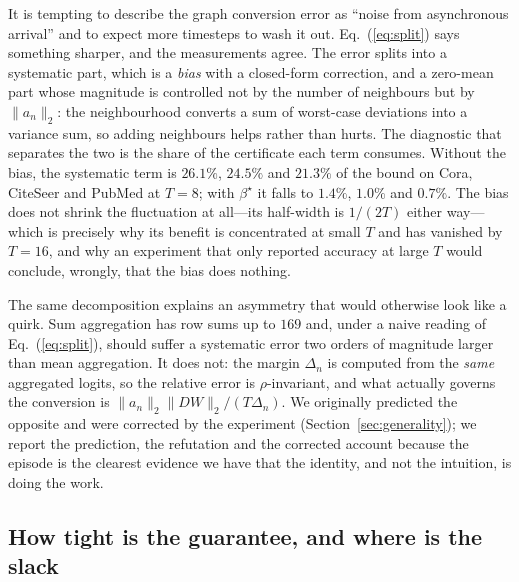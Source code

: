 \documentclass[10pt,twocolumn]{article}
\newcommand{\betastar}{\beta^{\star}}
\newcommand{\anorm}{\lVert a_{n}\rVert_{2}}
\newcommand{\Deltan}{\Delta_{n}}
\newcommand{\secref}[1]{Section~\ref{#1}}
\newcommand{\eqnref}[1]{Eq.~(\ref{#1})}
\begin{document}
It is tempting to describe the graph conversion error as ``noise from asynchronous arrival'' and to
expect more timesteps to wash it out. \eqnref{eq:split} says something sharper, and the measurements
agree. The error splits into a systematic part, which is a \emph{bias} with a closed-form correction,
and a zero-mean part whose magnitude is controlled not by the number of neighbours but by $\anorm$:
the neighbourhood converts a sum of worst-case deviations into a variance sum, so adding neighbours
helps rather than hurts. The diagnostic that separates the two is the share of the certificate each
term consumes. Without the bias, the systematic term is $26.1\%$, $24.5\%$ and $21.3\%$ of the bound
on Cora, CiteSeer and PubMed at $T=8$; with $\betastar$ it falls to $1.4\%$, $1.0\%$ and $0.7\%$. The
bias does not shrink the fluctuation at all---its half-width is $1/(2T)$ either way---which is
precisely why its benefit is concentrated at small $T$ and has vanished by $T=16$, and why an
experiment that only reported accuracy at large $T$ would conclude, wrongly, that the bias does
nothing.

The same decomposition explains an asymmetry that would otherwise look like a quirk. Sum aggregation
has row sums up to $169$ and, under a naive reading of \eqnref{eq:split}, should suffer a systematic
error two orders of magnitude larger than mean aggregation. It does not: the margin $\Deltan$ is
computed from the \emph{same} aggregated logits, so the relative error is $\rho$-invariant, and what
actually governs the conversion is $\anorm\lVert DW\rVert_{2}/(T\Deltan)$. We originally predicted
the opposite and were corrected by the experiment (\secref{sec:generality}); we report the
prediction, the refutation and the corrected account because the episode is the clearest evidence we
have that the identity, and not the intuition, is doing the work.

\subsection{How tight is the guarantee, and where is the slack}
\label{sec:tight}
\end{document}
